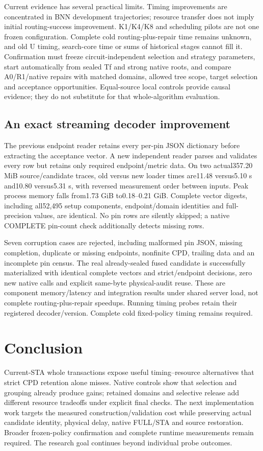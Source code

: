 \documentclass[conference,10pt]{IEEEtran}
\begin{document}
Current evidence has several practical limits. Timing improvements are concentrated in BNN development trajectories; resource transfer does not imply initial routing-success improvement. K1/K4/K8 and scheduling pilots are not one frozen configuration. Complete cold routing-plus-repair time remains unknown, and old U timing, search-core time or sums of historical stages cannot fill it. Confirmation must freeze circuit-independent selection and strategy parameters, start automatically from sealed Tf and strong native roots, and compare A0/R1/native repairs with matched domains, allowed tree scope, target selection and acceptance opportunities. Equal-source local controls provide causal evidence; they do not substitute for that whole-algorithm evaluation.

\subsection{An exact streaming decoder improvement}
The previous endpoint reader retains every per-pin JSON dictionary before extracting the acceptance vector. A new independent reader parses and validates every row but retains only required endpoint/metric data. On two actual357.20 MiB source/candidate traces, old versus new loader times are11.48 versus5.10 s and10.80 versus5.31 s, with reversed measurement order between inputs. Peak process memory falls from1.73 GiB to0.18--0.21 GiB. Complete vector digests, including all52,495 setup components, endpoint/domain identities and full-precision values, are identical. No pin rows are silently skipped; a native COMPLETE pin-count check additionally detects missing rows.

Seven corruption cases are rejected, including malformed pin JSON, missing completion, duplicate or missing endpoints, nonfinite CPD, trailing data and an incomplete pin census. The real already-sealed fused candidate is successfully materialized with identical complete vectors and strict/endpoint decisions, zero new native calls and explicit same-byte physical-audit reuse. These are component memory/latency and integration results under shared server load, not complete routing-plus-repair speedups. Running timing probes retain their registered decoder/version. Complete cold fixed-policy timing remains required.

\section{Conclusion}
Current-STA whole transactions expose useful timing--resource alternatives that strict CPD retention alone misses. Native controls show that selection and grouping already produce gains; retained domains and selective release add different resource tradeoffs under explicit final checks. The next implementation work targets the measured construction/validation cost while preserving actual candidate identity, physical delay, native FULL/STA and source restoration. Broader frozen-policy confirmation and complete runtime measurements remain required. The research goal continues beyond individual probe outcomes.
\end{document}
